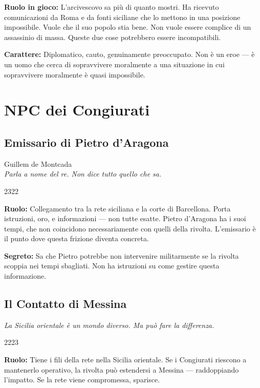 \textbf{Ruolo in gioco:} L'arcivescovo sa più di quanto mostri.
Ha ricevuto comunicazioni da Roma e da fonti siciliane che lo mettono
in una posizione impossibile. Vuole che il suo popolo stia bene.
Non vuole essere complice di un assassinio di massa. Queste due
cose potrebbero essere incompatibili.

\textbf{Carattere:} Diplomatico, cauto, genuinamente preoccupato.
Non è un eroe — è un uomo che cerca di sopravvivere moralmente
a una situazione in cui sopravvivere moralmente è quasi impossibile.

\secsep

\section{NPC dei Congiurati}

\subsection{Emissario di Pietro d'Aragona}
{\cinzel\footnotesize\color{grigionote} Guillem de Montcada}\\
\textit{Parla a nome del re. Non dice tutto quello che sa.}

%
{2}{3}{2}{2}

\textbf{Ruolo:} Collegamento tra la rete siciliana e la corte di Barcellona.
Porta istruzioni, oro, e informazioni — non tutte esatte. Pietro d'Aragona
ha i suoi tempi, che non coincidono necessariamente con quelli della
rivolta. L'emissario è il punto dove questa frizione diventa concreta.

\textbf{Segreto:} Sa che Pietro potrebbe non intervenire militarmente
se la rivolta scoppia nei tempi sbagliati. Non ha istruzioni su
come gestire questa informazione.

\subsection{Il Contatto di Messina}
\textit{La Sicilia orientale è un mondo diverso. Ma può fare la differenza.}

%
{2}{2}{2}{3}

\textbf{Ruolo:} Tiene i fili della rete nella Sicilia orientale.
Se i Congiurati riescono a mantenerlo operativo, la rivolta può
estendersi a Messina — raddoppiando l'impatto. Se la rete viene
compromessa, sparisce.

